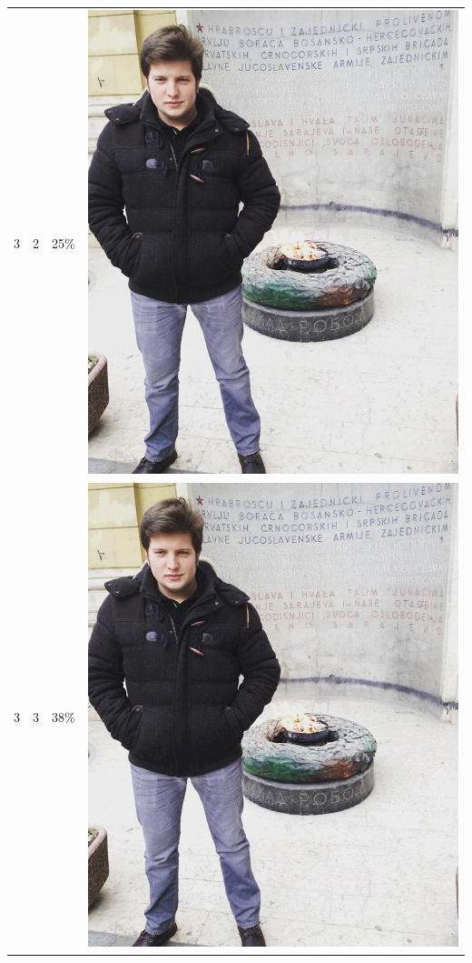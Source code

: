 \documentclass[times, utf8, seminar, numeric]{fer}
\begin{document}
\begin{center}
\begin{longtable}{|c|c|c|c|}
3 & 2 &25\% & \includegraphics[scale=0.3]{../benchmark_results/pattern/3_components-2_bits.png} \\
3 & 3 &38\% & \includegraphics[scale=0.3]{../benchmark_results/pattern/3_components-3_bits.png} \\

\end{longtable}
\end{center}
\end{document}
